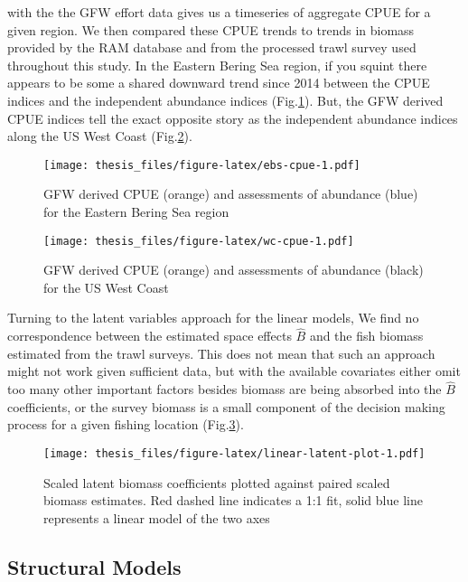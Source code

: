 \documentclass[twoside,12pt,final]{ucthesis-CA2012}
\begin{document}
\begin{ucmainmatter}
with the the GFW effort data gives us a timeseries of aggregate CPUE for
a given region. We then compared these CPUE trends to trends in biomass
provided by the RAM database and from the processed trawl survey used
throughout this study. In the Eastern Bering Sea region, if you squint
there appears to be some a shared downward trend since 2014 between the
CPUE indices and the independent abundance indices
(Fig.\ref{fig:ebs-cpue}). But, the GFW derived CPUE indices tell the
exact opposite story as the independent abundance indices along the US
West Coast (Fig.\ref{fig:wc-cpue}).
\begin{figure}
\centering
\texttt{[image: thesis\_files/figure-latex/ebs-cpue-1.pdf]}
\caption{\label{fig:ebs-cpue}GFW derived CPUE (orange) and assessments of
abundance (blue) for the Eastern Bering Sea region}
\end{figure}
\begin{figure}
\centering
\texttt{[image: thesis\_files/figure-latex/wc-cpue-1.pdf]}
\caption{\label{fig:wc-cpue}GFW derived CPUE (orange) and assessments of
abundance (black) for the US West Coast}
\end{figure}
Turning to the latent variables approach for the linear models, We find
no correspondence between the estimated space effects \(\hat{B}\) and
the fish biomass estimated from the trawl surveys. This does not mean
that such an approach might not work given sufficient data, but with the
available covariates either omit too many other important factors
besides biomass are being absorbed into the \(\hat{B}\) coefficients, or
the survey biomass is a small component of the decision making process
for a given fishing location (Fig.\ref{fig:linear-latent-plot}).
\begin{figure}
\centering
\texttt{[image: thesis\_files/figure-latex/linear-latent-plot-1.pdf]}
\caption{\label{fig:linear-latent-plot}Scaled latent biomass coefficients
plotted against paired scaled biomass estimates. Red dashed line
indicates a 1:1 fit, solid blue line represents a linear model of the
two axes}
\end{figure}
\subsection{Structural Models}\label{structural-models-1}


\end{ucmainmatter}
\end{document}
